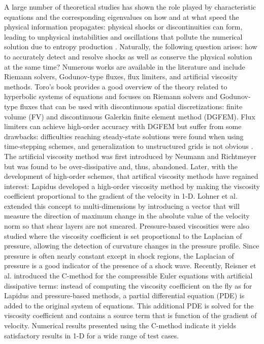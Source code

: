 A large number of theoretical studies has shown the role played by characteristic equations and the corresponding eigenvalues on how and at what speed the physical information propagates: physical shocks or discontinuities can form, leading to unphysical instabilities and oscillations that pollute the numerical solution due to entropy production \cite{Toro}. Naturally, the following question arises: how to accurately detect and resolve shocks as well as conserve the physical solution at the same time? Numerous works are available in the literature and include Riemann solvers, Godunov-type fluxes, flux limiters, and artificial viscosity methods. Toro's book \cite{Toro} provides a good overview of the theory related to hyperbolic systems of equations and focuses on Riemann solvers and Godunov-type fluxes that can be used with discontinuous spatial discretizations: finite volume (FV) and discontinuous Galerkin finite element method (DGFEM).
Flux limiters \cite{FluxLimiter1, FluxLimiter3} can achieve high-order accuracy with DGFEM \cite{FluxLimiter2} but suffer from some drawbacks: difficulties reaching steady-state solutions were found when using time-stepping schemes, and generalization to unstructured grids is not obvious \cite{FluxLimiter4}. The artificial viscosity method was first introduced by Neumann and Richtmeyer \cite{Neumann} but was found to be over-dissipative and, thus, abandoned. Later, with the development of high-order schemes, that artifical viscosity methods have regained interest: Lapidus \cite{Lapidus_paper, Lapidus_book} developed a high-order viscosity method by making the viscosity coefficient proportional to the gradient of the velocity in 1-D. Lohner et al. \cite{LMP} extended this concept to multi-dimensions by introducing a vector that will measure the direction of maximum change in the absolute value of the velocity norm so that shear layers are not smeared. Pressure-based viscosities were also studied \cite{PBV_book} where the viscosity coefficient is set proportional to the Laplacian of pressure, allowing the detection of curvature changes in the pressure profile. Since pressure is often nearly constant except in shock regions, the Laplacian of pressure is a good indicator of the presence of a shock wave.
Recently, Reisner et al. \cite{Reisner} introduced the C-method for the compressible Euler equations with artificial dissipative terms: instead of computing the viscosity coefficient on the fly as for Lapidus and pressure-based methods, a partial differential equation (PDE) is added to the original system of equations. This additional PDE is solved for the viscosity coefficient and contains a source term that is function of the gradient of velocity. Numerical results presented using the C-method indicate it yields satisfactory results in 1-D for a wide range of test cases. 
